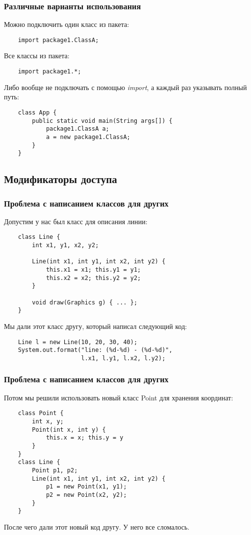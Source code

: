 \begin{frame}[fragile]
	\frametitle{Различные варианты использования}

	\begin{large}
	Можно подключить один класс из пакета:
	\begin{verbatim}
	import package1.ClassA;
	\end{verbatim}

	Все классы из пакета:
	\begin{verbatim}
	import package1.*;
	\end{verbatim}

	Либо вообще не подключать с помощью \emph{import}, а каждый раз указывать полный путь:
	\begin{verbatim}
	class App {
	    public static void main(String args[]) {
	        package1.ClassA a;
	        a = new package1.ClassA;
	    }
	}
	\end{verbatim}
	\end{large}
\end{frame}

\subsection{Модификаторы доступа}

\begin{frame}[fragile]
	\frametitle{Проблема с написанием классов для других}
	Допустим у нас был класс для описания линии:
	\begin{verbatim}
	class Line {
	    int x1, y1, x2, y2;

	    Line(int x1, int y1, int x2, int y2) {
	        this.x1 = x1; this.y1 = y1;
	        this.x2 = x2; this.y2 = y2;
	    }

	    void draw(Graphics g) { ... };
	}
	\end{verbatim}

	Мы дали этот класс другу, который написал следующий код:
	\begin{verbatim}
	Line l = new Line(10, 20, 30, 40);
	System.out.format("line: (%d-%d) - (%d-%d)",
	                  l.x1, l.y1, l.x2, l.y2);
	\end{verbatim}
\end{frame}

\begin{frame}[fragile]
	\frametitle{Проблема с написанием классов для других}
	Потом мы решили использовать новый класс Point для хранения координат:
	\begin{verbatim}
	class Point {
	    int x, y;
	    Point(int x, int y) {
	        this.x = x; this.y = y
	    }
	}
	class Line {
	    Point p1, p2;
	    Line(int x1, int y1, int x2, int y2) {
	        p1 = new Point(x1, y1);
	        p2 = new Point(x2, y2);
	    }
	}
	\end{verbatim}

	После чего дали этот новый код другу. У него все сломалось.
\end{frame}

